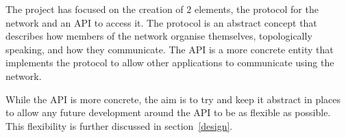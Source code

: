 	The project has focused on the creation of 2 elements, the protocol for the network and an API to access it. The protocol is an abstract concept that describes how members of the network organise themselves, topologically speaking, and how they communicate. The API is a more concrete entity that implements the protocol to allow other applications to communicate using the network. 
	
	While the API is more concrete, the aim is to try and keep it abstract in places to allow any future development around the API to be as flexible as possible. This flexibility is further discussed in section~\ref{design}.